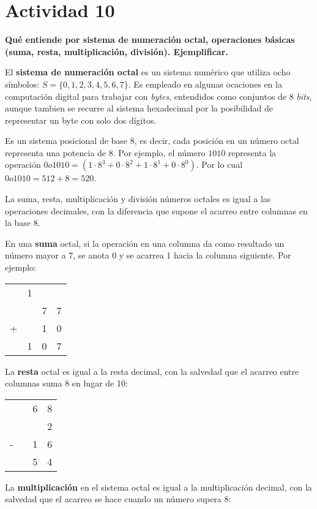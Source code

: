 \section*{Actividad 10}
\textbf{Qué entiende por sistema de numeración octal, operaciones básicas (suma, resta, multiplicación, división). Ejemplificar.}

El \textbf{sistema de numeración octal} es un sistema numérico que utiliza ocho símbolos: $S=\{0,1,2,3,4,5,6,7\}$. Es empleado en algunas ocaciones en la computación digital para trabajar con \textit{bytes}, entendidos como conjuntos de 8 \textit{bits}, aunque tambien se recurre al sistema hexadecimal por la posibilidad de representar un byte con solo dos dígitos.

Es un sistema posicional de base 8, es decir, cada posición en un número octal representa una potencia de 8. Por ejemplo, el número $1010$ representa la operación $0o1010 = (1 \cdot 8^{3} + 0 \cdot 8^{2} + 1 \cdot 8^{1} + 0 \cdot 8^{0})$. Por lo cual $0o1010 = 512 + 8 = 520$. 

La suma, resta, multiplicación y división números octales es igual a las operaciones decimales, con la diferencia que supone el acarreo entre columnas en la base 8.

En una \textbf{suma} octal, si la operación en una columna da como resultado un número mayor a 7, se anota 0 y se acarrea 1 hacia la columna siguiente. Por ejemplo:

\begin{tabular}{cccc}
	  & 1 &   &   \\
	  &   & 7 & 7 \\
	+ &   & 1 & 0 \\
\hline
	  & 1 & 0 & 7 \\
\end{tabular}

La \textbf{resta} octal es igual a la resta decimal, con la salvedad que el acarreo entre columnas suma 8 en lugar de 10:

\begin{tabular}{cccc}
	  &   & 6 & 8 \\
	  &   & \cancel{7} & 2 \\
	- &   & 1 & 6 \\
\hline
	  &   & 5 & 4 \\
\end{tabular}

La \textbf{multiplicación} en el sistema octal es igual a la multiplicación decimal, con la salvedad que el acarreo se hace cuando un número supera 8:

